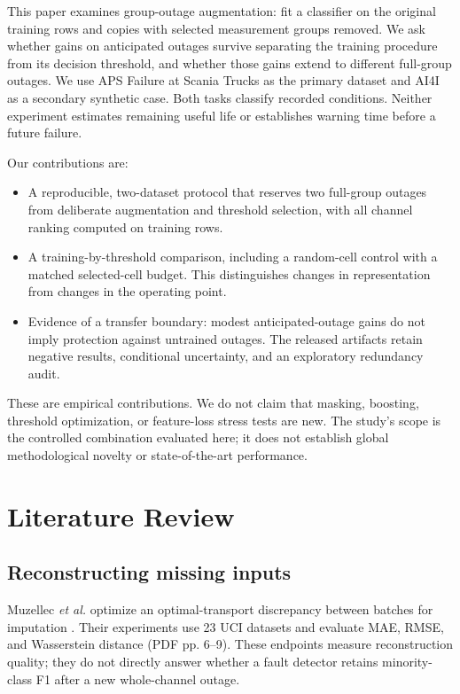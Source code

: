 \documentclass[conference]{IEEEtran}
\begin{document}
This paper examines group-outage augmentation: fit a classifier on the original training rows and copies with selected measurement groups removed. We ask whether gains on anticipated outages survive separating the training procedure from its decision threshold, and whether those gains extend to different full-group outages. We use APS Failure at Scania Trucks as the primary dataset and AI4I as a secondary synthetic case. Both tasks classify recorded conditions. Neither experiment estimates remaining useful life or establishes warning time before a future failure.

Our contributions are:
\begin{itemize}
\item A reproducible, two-dataset protocol that reserves two full-group outages from deliberate augmentation and threshold selection, with all channel ranking computed on training rows.
\item A training-by-threshold comparison, including a random-cell control with a matched selected-cell budget. This distinguishes changes in representation from changes in the operating point.
\item Evidence of a transfer boundary: modest anticipated-outage gains do not imply protection against untrained outages. The released artifacts retain negative results, conditional uncertainty, and an exploratory redundancy audit.
\end{itemize}
These are empirical contributions. We do not claim that masking, boosting, threshold optimization, or feature-loss stress tests are new. The study's scope is the controlled combination evaluated here; it does not establish global methodological novelty or state-of-the-art performance.

\section{Literature Review}
\subsection{Reconstructing missing inputs}
Muzellec \emph{et al.} optimize an optimal-transport discrepancy between batches for imputation \cite{muzellec20a}. Their experiments use 23 UCI datasets and evaluate MAE, RMSE, and Wasserstein distance (PDF pp. 6--9). These endpoints measure reconstruction quality; they do not directly answer whether a fault detector retains minority-class F1 after a new whole-channel outage.
\end{document}
